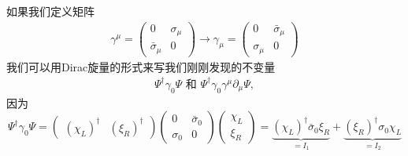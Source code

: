 如果我们定义矩阵
\begin{align}
\label{equ6.13}
\gamma^\mu=\left(\begin{matrix}0&\sigma_\mu\\\bar\sigma_\mu&0\end{matrix}\right)\to\gamma_\mu=\left(\begin{matrix}0&\bar\sigma_\mu\\\sigma_\mu&0\end{matrix}\right)
\end{align}
我们可以用Dirac旋量的形式来写我们刚刚发现的不变量
\begin{align}
\label{equ6.14}
\Psi^\dagger\gamma_0\Psi \text{\ \ 和\ \ }\Psi^\dagger\gamma_0\gamma^\mu\partial_\mu\Psi,
\end{align}
因为
\[\Psi^\dagger \gamma_0 \Psi = \left(
    \begin{matrix}
        (\chi_L)^\dagger&(\xi_R)^\dagger
    \end{matrix}
\right) \left(
    \begin{matrix}
    0 & \bar\sigma_0\\
    \sigma_0 & 0
    \end{matrix}
\right) \left(
    \begin{matrix}
    \chi_L\\
    \xi_R
    \end{matrix}
\right) = \underbrace{(\chi_L)^\dagger \bar\sigma_0\xi_R}_{=I_1}+\underbrace{(\xi_R)^\dagger\sigma_0\chi_L}_{=I_2} \]

